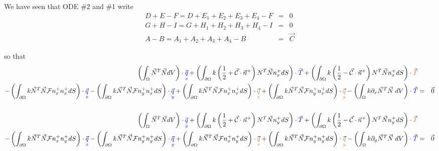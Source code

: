 \begin{landscape}

\noindent We have seen that ODE \#2 and \#1 write
\begin{eqnarray}
D+E-F = D+E_1+E_2+E_3+E_4-F &=&0\\
G+H-I = G+H_1+H_2+H_3+H_4-I &=&0\\
A-B = A_1 + A_2 + A_3 + A_4 - B &=& \vec{C}
\end{eqnarray}

so that 
\begin{eqnarray}
\left( \int_\Omega \vec{N}^T \vec{N} dV \right) \cdot {\color{blue}\vec{\qx}} 
+ \left(\int_{\partial\Omega} k \left( \frac{1}{2} + \vec{\cal C} \cdot \vec{n}^+ \right) {N}^T \vec{N} n^+_x dS \right)\cdot \vec{\color{blue}T} 
+ \left(\int_{\partial\Omega} k \left( \frac{1}{2} - \vec{\cal C} \cdot \vec{n}^+ \right) {N}^T \vec{N} n^+_x dS \right)\cdot \vec{\color{brown}T} && \nn\\
-\left(\int_{\partial\Omega} k \vec{N}^T\vec{N}  {\cal F} {n}^+_x   n^+_x dS \right)\cdot \vec{\blueqx} 
-\left(\int_{\partial\Omega} k \vec{N}^T\vec{N}  {\cal F} {n}^+_y   n^+_x dS \right)\cdot \vec{\blueqy} 
+ \left(\int_{\partial\Omega} k \vec{N}^T\vec{N}  {\cal F} {n}^+_x   n^+_x dS \right)\cdot \vec{\brownqx} 
+\left(\int_{\partial\Omega} k \vec{N}^T\vec{N}  {\cal F} {n}^+_y   n^+_x dS \right)\cdot \vec{\brownqy} 
- \left( \int_\Omega k \partial_x \vec{N}^T \vec{N} \; dV \right) \cdot \vec{\color{blue} T} &=& \vec{0} 
\nn\\
\nn\\
\left( \int_\Omega \vec{N}^T \vec{N} dV \right) \cdot {\color{blue}\vec{\qy}} 
+ \left(\int_{\partial\Omega} k \left( \frac{1}{2} + \vec{\cal C} \cdot \vec{n}^+ \right) {N}^T \vec{N} n^+_y dS \right)\cdot \vec{\color{blue}T} 
+ \left(\int_{\partial\Omega} k \left( \frac{1}{2} - \vec{\cal C} \cdot \vec{n}^+ \right) {N}^T \vec{N} n^+_y dS \right)\cdot \vec{\color{brown}T} && \nn\\
-\left(\int_{\partial\Omega} k \vec{N}^T\vec{N}  {\cal F} {n}^+_x   n^+_y dS \right)\cdot \vec{\blueqx} 
-\left(\int_{\partial\Omega} k \vec{N}^T\vec{N}  {\cal F} {n}^+_y   n^+_y dS \right)\cdot \vec{\blueqy} 
+ \left(\int_{\partial\Omega} k \vec{N}^T\vec{N}  {\cal F} {n}^+_x   n^+_y dS \right)\cdot \vec{\brownqx} 
+\left(\int_{\partial\Omega} k \vec{N}^T\vec{N}  {\cal F} {n}^+_y   n^+_y dS \right)\cdot \vec{\brownqy} 
- \left( \int_\Omega k \partial_y \vec{N}^T \vec{N} \; dV \right) \cdot \vec{\color{blue} T} &=& \vec{0} 
\nn \\

\end{eqnarray}
\end{landscape}
